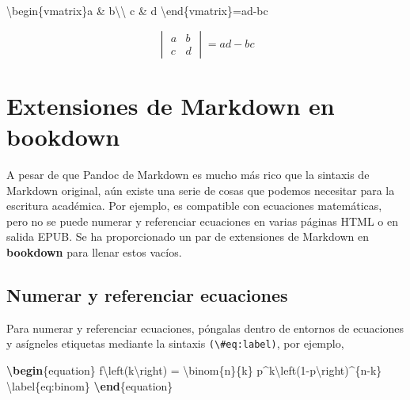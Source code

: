 \documentclass[12pt,]{krantz}
\makeatletter
\newenvironment{Shaded}{\begin{snugshade}}{\end{snugshade}}
\newcommand{\KeywordTok}[1]{\textcolor[rgb]{0.13,0.29,0.53}{\textbf{#1}}}
\newcommand{\SpecialCharTok}[1]{\textcolor[rgb]{0.00,0.00,0.00}{#1}}
\newcommand{\SpecialStringTok}[1]{\textcolor[rgb]{0.31,0.60,0.02}{#1}}
\newcommand{\ExtensionTok}[1]{#1}
\newcommand{\NormalTok}[1]{#1}
\newenvironment{kframe}{%
\medskip{}
\setlength{\fboxsep}{.8em}
 \def\at@end@of@kframe{}%
 \ifinner\ifhmode%
  \def\at@end@of@kframe{\end{minipage}}%
  \begin{minipage}{\columnwidth}%
 \fi\fi%
 \def\FrameCommand##1{\hskip\@totalleftmargin \hskip-\fboxsep
 \colorbox{shadecolor}{##1}\hskip-\fboxsep
     \hskip-\linewidth \hskip-\@totalleftmargin \hskip\columnwidth}%
 \MakeFramed {\advance\hsize-\width
   \@totalleftmargin\z@ \linewidth\hsize
   \@setminipage}}%
 {\par\unskip\endMakeFramed%
 \at@end@of@kframe}
\renewenvironment{Shaded}{\begin{kframe}}{\end{kframe}}
\theoremstyle{definition}
\theoremstyle{definition}
\theoremstyle{definition}
\theoremstyle{remark}
\makeatother
\begin{document}
\begin{Shaded}
\begin{Highlighting}[]
\SpecialStringTok{$$}\SpecialCharTok{\textbackslash{}begin}\SpecialStringTok{\{vmatrix\}a & b}\SpecialCharTok{\textbackslash{}\textbackslash{}}
\SpecialStringTok{c & d}
\SpecialCharTok{\textbackslash{}end}\SpecialStringTok{\{vmatrix\}=ad-bc$$}
\end{Highlighting}
\end{Shaded}

\[\begin{vmatrix}a & b\\
c & d
\end{vmatrix}=ad-bc\]

\section{Extensiones de Markdown en
bookdown}\label{extensiones-de-markdown-en-bookdown}

A pesar de que Pandoc de Markdown es mucho más rico que la sintaxis de
Markdown original, aún existe una serie de cosas que podemos necesitar
para la escritura académica. Por ejemplo, es compatible con ecuaciones
matemáticas, pero no se puede numerar y referenciar ecuaciones en varias
páginas HTML o en salida EPUB. Se ha proporcionado un par de extensiones
de Markdown en \textbf{bookdown} para llenar estos vacíos.

\subsection{Numerar y referenciar ecuaciones}\label{ecuaciones}

Para numerar y referenciar
ecuaciones, póngalas dentro de entornos de
ecuaciones y asígneles etiquetas mediante la sintaxis
\texttt{(\textbackslash{}\#eq:label)}, por ejemplo,

\begin{Shaded}
\begin{Highlighting}[]
\KeywordTok{\textbackslash{}begin}\NormalTok{\{}\ExtensionTok{equation}\NormalTok{\}}\SpecialStringTok{ }
\SpecialStringTok{  f}\SpecialCharTok{\textbackslash{}left}\SpecialStringTok{(k}\SpecialCharTok{\textbackslash{}right}\SpecialStringTok{) = }\SpecialCharTok{\textbackslash{}binom}\SpecialStringTok{\{n\}\{k\} p^k}\SpecialCharTok{\textbackslash{}left}\SpecialStringTok{(1-p}\SpecialCharTok{\textbackslash{}right}\SpecialStringTok{)^\{n-k\}}
\SpecialStringTok{  }\SpecialCharTok{\textbackslash{}label}\SpecialStringTok{\{eq:binom\}}
\KeywordTok{\textbackslash{}end}\NormalTok{\{}\ExtensionTok{equation}\NormalTok{\} }
\end{Highlighting}
\end{Shaded}
\end{document}
